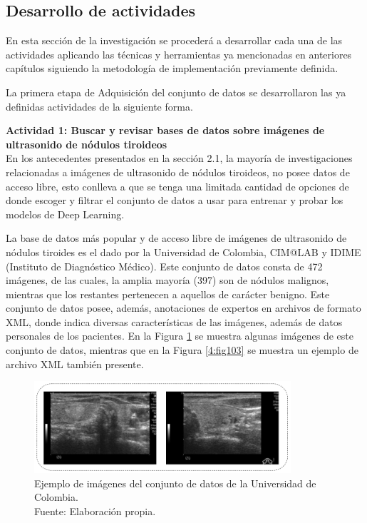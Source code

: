 \subsection{Desarrollo de actividades}

En esta sección de la investigación se procederá a desarrollar cada una de las actividades aplicando las técnicas y herramientas ya mencionadas en anteriores capítulos siguiendo la metodología de implementación previamente definida.

La primera etapa de Adquisición del conjunto de datos se desarrollaron las ya definidas actividades de la siguiente forma.

\textbf{Actividad 1: Buscar y revisar bases de datos sobre imágenes de ultrasonido de nódulos tiroideos}
\\
En los antecedentes presentados en la sección 2.1, la mayoría de investigaciones relacionadas a imágenes de ultrasonido de nódulos tiroideos, no posee datos de acceso libre, esto conlleva a que se tenga una limitada cantidad de opciones de donde escoger y filtrar el conjunto de datos a usar para entrenar y probar los modelos de Deep Learning.

La base de datos más popular y de acceso libre de imágenes de ultrasonido de nódulos tiroides es el dado por la Universidad de Colombia, CIM@LAB y IDIME (Instituto de Diagnóstico Médico). Este conjunto de datos consta de 472 imágenes, de las cuales, la amplia mayoría (397) son de nódulos malignos, mientras que los restantes pertenecen a aquellos de carácter benigno. Este conjunto de datos posee, además, anotaciones de expertos en archivos de formato XML, donde indica diversas características de las imágenes, además de datos personales de los pacientes. En la Figura \ref{4:fig102} se muestra algunas imágenes de este conjunto de datos, mientras que en la Figura \ref{4:fig103} se muestra un ejemplo de archivo XML también presente.

\begin{figure}[H]
	\begin{center}
		\includegraphics[width=0.85\textwidth]{4/figures/nodule_ddti.png}
		\caption[Ejemplo de imágenes del conjunto de datos de la Universidad de Colombia]{Ejemplo de imágenes del conjunto de datos de la Universidad de Colombia. \\
		Fuente: Elaboración propia.}
		\label{4:fig102}
	\end{center}
\end{figure}

